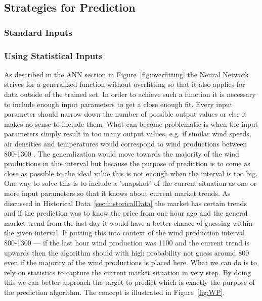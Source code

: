 \subsection{Strategies for Prediction}
\subsubsection{Standard Inputs}

\subsubsection{Using Statistical Inputs}
\label{sec:usingStatisticalInput}
As described in the ANN section  in Figure~\ref{fig:overfitting} the Neural Network strives for a generalized function without overfitting so that it also applies for data outside of the trained set. In order to achieve such a function it is necessary to include enough input parameters to get a close enough fit. Every input parameter should narrow down the number of possible output values or else it makes no sense to include them. What can become problematic is when the input parameters simply result in too many output values, e.g. if similar wind speeds, air densities and temperatures would correspond to wind productions between 800-1300 . The generalization would move towards the majority of the wind productions in this interval but because the purpose of prediction is to come as close as possible to the ideal value this is not enough when the interval is too big. One way to solve this is to include a "snapshot" of the current situation as one or more input parameters so that it knows about current market trends. As discussed in Historical Data~\ref{sec:historicalData} the market has certain trends  and if the prediction was to know the price from one hour ago and the general market trend from the last day it would have a better chance of guessing within the given interval. If putting this into context of the wind production interval 800-1300 --- if the last hour wind production was 1100 and the current trend is upwards then the algorithm should with high probability not guess around 800 even if the majority of the wind productions is placed here. What we can do is to rely on statistics to capture the current market situation in very step. By doing this we can better approach the target to predict which is exactly the purpose of the prediction algorithm. The concept is illustrated in Figure~\ref{fig:WP}.

